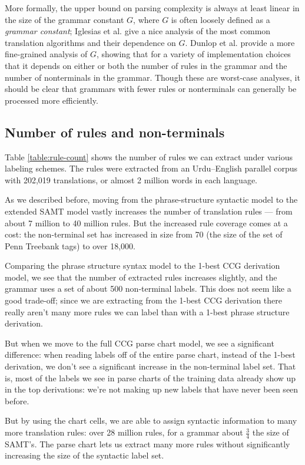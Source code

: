 \documentclass[a4paper]{article}
\begin{document}
More formally, the upper bound on parsing complexity is always at
least linear in the size of the grammar constant $G$, where $G$ is
often loosely defined as a {\it grammar constant}; Iglesias et al.
 give a nice analysis of the most common translation algorithms
and their dependence on $G$. Dunlop et al.  provide a more
fine-grained analysis of $G$, showing that for a variety of
implementation choices that it depends on either or both the number of
rules in the grammar and the number of nonterminals in the grammar.
Though these are worst-case analyses, it should be clear that grammars
with fewer rules or nonterminals can generally be processed more
efficiently.

\subsection{Number of rules and non-terminals}

Table \ref{table:rule-count} shows the number of rules we can extract under various labeling schemes. The rules were extracted from an Urdu--English parallel corpus with 202,019 translations, or almost 2 million words in each language.

As we described before, moving from the phrase-structure syntactic model to the extended SAMT model vastly increases the number of translation rules --- from about 7 million to 40 million rules. But the increased rule coverage comes at a cost: the non-terminal set has increased in size from 70 (the size of the set of Penn Treebank tags) to over 18,000.

Comparing the phrase structure syntax model to the 1-best CCG derivation model, we see that the number of extracted rules increases slightly, and the grammar uses a set of about 500 non-terminal labels. This does not seem like a good trade-off; since we are extracting from the 1-best CCG derivation there really aren't many more rules we can label than with a 1-best phrase structure derivation.

But when we move to the full CCG parse chart model, we see a significant difference: when reading labels off of the entire parse chart, instead of the 1-best derivation, we don't see a significant increase in the non-terminal label set. That is, most of the labels we see in parse charts of the training data already show up in the top derivations: we're not making up new labels that have never been seen before.

But by using the chart cells, we are able to assign syntactic information to many more translation rules: over 28 million rules, for a grammar about $\frac{3}{4}$ the size of SAMT's. The parse chart lets us extract many more rules without significantly increasing the size of the syntactic label set.
\end{document}
